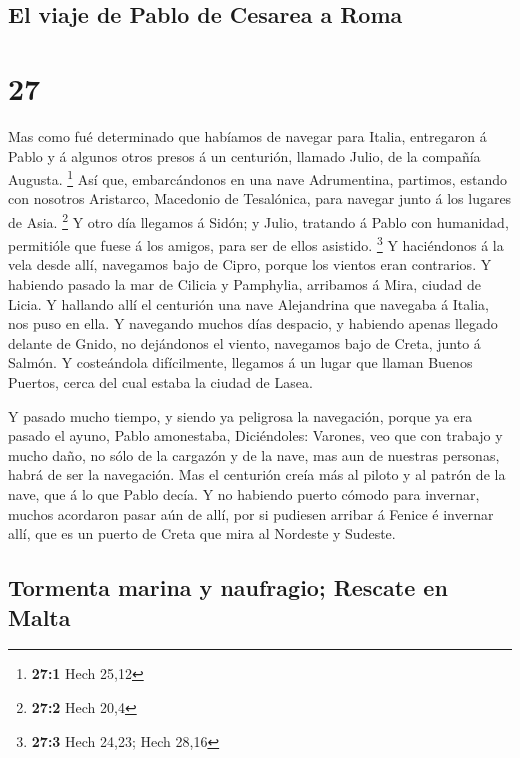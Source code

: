 \hypertarget{el-viaje-de-pablo-de-cesarea-a-roma}{%
\subsection{El viaje de Pablo de Cesarea a
Roma}\label{el-viaje-de-pablo-de-cesarea-a-roma}}

\hypertarget{section-26}{%
\section{27}\label{section-26}}

 Mas como fué determinado que habíamos de navegar para
Italia, entregaron á Pablo y á algunos otros presos á un centurión,
llamado Julio, de la compañía Augusta. \footnote{\textbf{27:1} Hech
  25,12}  Así que, embarcándonos en una nave Adrumentina,
partimos, estando con nosotros Aristarco, Macedonio de Tesalónica, para
navegar junto á los lugares de Asia. \footnote{\textbf{27:2} Hech 20,4}
 Y otro día llegamos á Sidón; y Julio, tratando á Pablo con
humanidad, permitióle que fuese á los amigos, para ser de ellos
asistido. \footnote{\textbf{27:3} Hech 24,23; Hech 28,16}  Y
haciéndonos á la vela desde allí, navegamos bajo de Cipro, porque los
vientos eran contrarios.  Y habiendo pasado la mar de
Cilicia y Pamphylia, arribamos á Mira, ciudad de Licia.  Y
hallando allí el centurión una nave Alejandrina que navegaba á Italia,
nos puso en ella.  Y navegando muchos días despacio, y
habiendo apenas llegado delante de Gnido, no dejándonos el viento,
navegamos bajo de Creta, junto á Salmón.  Y costeándola
difícilmente, llegamos á un lugar que llaman Buenos Puertos, cerca del
cual estaba la ciudad de Lasea.

 Y pasado mucho tiempo, y siendo ya peligrosa la navegación,
porque ya era pasado el ayuno, Pablo amonestaba, 
Diciéndoles: Varones, veo que con trabajo y mucho daño, no sólo de la
cargazón y de la nave, mas aun de nuestras personas, habrá de ser la
navegación.  Mas el centurión creía más al piloto y al
patrón de la nave, que á lo que Pablo decía.  Y no habiendo
puerto cómodo para invernar, muchos acordaron pasar aún de allí, por si
pudiesen arribar á Fenice é invernar allí, que es un puerto de Creta que
mira al Nordeste y Sudeste.

\hypertarget{tormenta-marina-y-naufragio-rescate-en-malta}{%
\subsection{Tormenta marina y naufragio; Rescate en
Malta}\label{tormenta-marina-y-naufragio-rescate-en-malta}}

